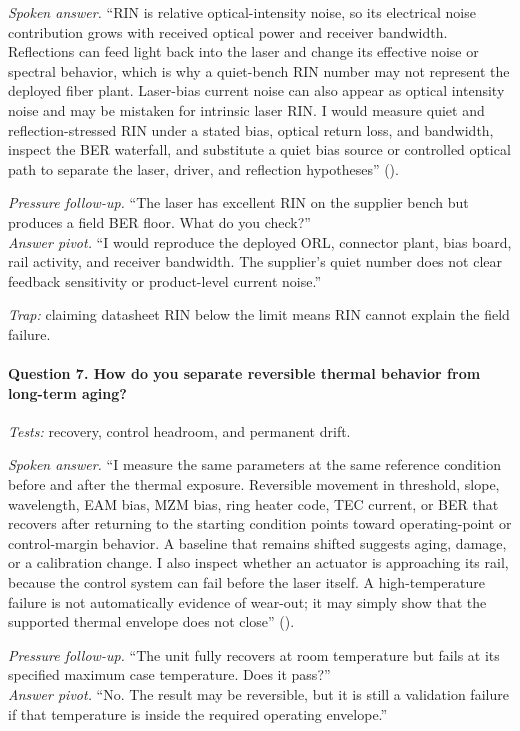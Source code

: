 \textit{Spoken answer.}
``RIN is relative optical-intensity noise, so its electrical noise contribution
grows with received optical power and receiver bandwidth. Reflections can feed
light back into the laser and change its effective noise or spectral behavior,
which is why a quiet-bench RIN number may not represent the deployed fiber
plant. Laser-bias current noise can also appear as optical intensity noise and
may be mistaken for intrinsic laser RIN. I would measure quiet and
reflection-stressed RIN under a stated bias, optical return loss, and
bandwidth, inspect the BER waterfall, and substitute a quiet bias source or
controlled optical path to separate the laser, driver, and reflection
hypotheses'' ().

\textit{Pressure follow-up.} ``The laser has excellent RIN on the supplier
bench but produces a field BER floor. What do you check?''\\
\textit{Answer pivot.} ``I would reproduce the deployed ORL, connector plant,
bias board, rail activity, and receiver bandwidth. The supplier's quiet number
does not clear feedback sensitivity or product-level current noise.''

\textit{Trap:} claiming datasheet RIN below the limit means RIN cannot explain
the field failure.

\paragraph{Question 7. How do you separate reversible thermal behavior from
long-term aging?}
\textit{Tests:} recovery, control headroom, and permanent drift.

\textit{Spoken answer.}
``I measure the same parameters at the same reference condition before and
after the thermal exposure. Reversible movement in threshold, slope,
wavelength, EAM bias, MZM bias, ring heater code, TEC current, or BER that
recovers after returning to the starting condition points toward operating-point
or control-margin behavior. A baseline that remains shifted suggests aging,
damage, or a calibration change. I also inspect whether an actuator is
approaching its rail, because the control system can fail before the laser
itself. A high-temperature failure is not automatically evidence of wear-out;
it may simply show that the supported thermal envelope does not close''
().

\textit{Pressure follow-up.} ``The unit fully recovers at room temperature but
fails at its specified maximum case temperature. Does it pass?''\\
\textit{Answer pivot.} ``No. The result may be reversible, but it is still a
validation failure if that temperature is inside the required operating
envelope.''

